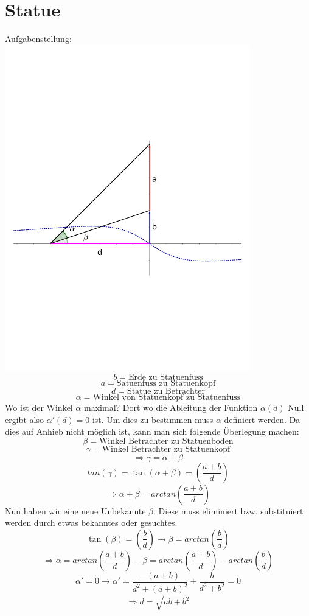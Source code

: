 \section{Statue}
Aufgabenstellung: \\
\includegraphics[width=0.8\textwidth]{bilder/statue.pdf}
\[ b = \text{Erde zu Statuenfuss} \]
\[ a = \text{Satuenfuss zu Statuenkopf} \]
\[ d = \text{Statue zu Betrachter} \]
\[ \alpha = \text{Winkel von Statuenkopf zu Statuenfuss} \]
Wo ist der Winkel $\alpha$ maximal? Dort wo die Ableitung der Funktion $\alpha(d)$ Null ergibt also $\alpha'(d)=0$ ist. 
Um dies zu bestimmen muss $\alpha$ definiert werden. 
Da dies auf Anhieb nicht möglich ist, kann man sich folgende Überlegung machen:
\[ \beta = \text{Winkel Betrachter zu Statuenboden} \]
\[ \gamma = \text{Winkel Betrachter zu Statuenkopf} \]
\[ \Rightarrow \gamma = \alpha + \beta \]
\[ tan(\gamma) = \tan(\alpha + \beta) = \left(\frac{a+b}{d}\right) \]
\[ \Rightarrow \alpha + \beta = arctan\left(\frac{a+b}{d}\right) \]
Nun haben wir eine neue Unbekannte $\beta$. Diese muss eliminiert bzw. substituiert werden durch etwas bekanntes oder gesuchtes.
\[ \tan(\beta) = \left(\frac{b}{d}\right) \rightarrow \beta = arctan\left(\frac{b}{d}\right) \]
\[ \Rightarrow \alpha = arctan\left(\frac{a+b}{d}\right) - \beta = arctan\left(\frac{a+b}{d}\right) - arctan\left(\frac{b}{d}\right) \]
\[ \alpha' \stackrel{!}{=} 0 \rightarrow \alpha' = \frac{-(a+b)}{d^2 + (a+b)^2} + \frac{b}{d^2 + b^2} = 0 \]
\[ \Rightarrow d = \sqrt{ab + b^2} \]